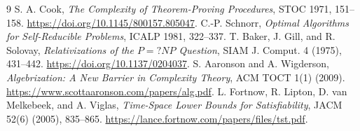 \documentclass[11pt]{article}
\begin{document}
\begin{thebibliography}{9}
 S. A. Cook,
\emph{The Complexity of Theorem-Proving Procedures}, STOC 1971, 151--158.
\url{https://doi.org/10.1145/800157.805047}.
 C.-P. Schnorr,
\emph{Optimal Algorithms for Self-Reducible Problems}, ICALP 1981, 322--337.
 T. Baker, J. Gill, and R. Solovay,
\emph{Relativizations of the $P=?NP$ Question}, SIAM J. Comput. 4 (1975),
431--442. \url{https://doi.org/10.1137/0204037}.
 S. Aaronson and A. Wigderson,
\emph{Algebrization: A New Barrier in Complexity Theory}, ACM TOCT 1(1)
(2009). \url{https://www.scottaaronson.com/papers/alg.pdf}.
 L. Fortnow, R. Lipton, D. van Melkebeek, and A. Viglas,
\emph{Time-Space Lower Bounds for Satisfiability}, JACM 52(6) (2005),
835--865. \url{https://lance.fortnow.com/papers/files/tst.pdf}.
\end{thebibliography}

\end{document}
